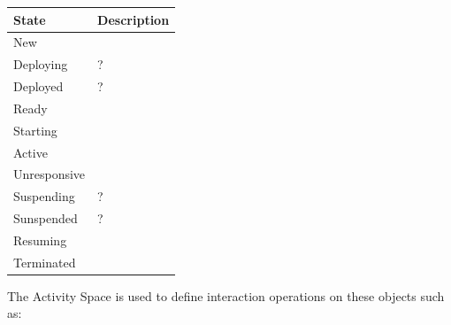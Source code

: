 \begin{enumerate}
\begin{enumerate}
\begin{table}[H]
\begin{center}
\begin{tabular}{|p{3cm}|p{11cm}|} 
\hline
\rowcolor{lightgray}	State	& 	Description \\
\hline

New			&	 \\
\hline
Deploying	&	? \\
\hline
Deployed 	& 	? \\
\hline
Ready 		&	 \\
\hline
Starting 	&	 \\
\hline
Active 		&	 \\
\hline
Unresponsive 	&	 \\
\hline
Suspending 	&	? \\
\hline
Sunspended 	&	? \\
\hline
Resuming 	&	 \\
\hline
Terminated 	&	 \\
\hline

\end{tabular}
\end{center}
\end{table}

\end{enumerate}

\end{enumerate}

The Activity Space is used to define interaction operations on these objects such as:

